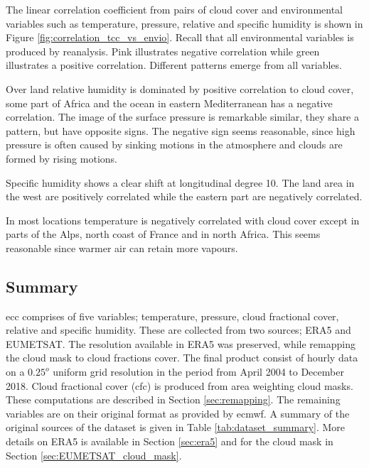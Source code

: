 The linear correlation coefficient from pairs of cloud cover and environmental variables such as temperature, pressure, relative and specific humidity is shown in Figure \ref{fig:correlation_tcc_vs_envio}. Recall that all environmental variables is produced by reanalysis. Pink illustrates negative correlation while green illustrates a positive correlation. Different patterns emerge from all variables. %

Over land relative humidity is dominated by positive correlation to cloud cover, some part of Africa and the ocean in eastern Mediterranean has a negative correlation. The image of the surface pressure is remarkable similar, they share a pattern, but have opposite signs. The negative sign seems reasonable, since high pressure is often caused by sinking motions in the atmosphere and clouds are formed by rising motions. 

Specific humidity shows a clear shift at longitudinal degree 10. The land area in the west are positively correlated while the eastern part are  negatively correlated. 

In most locations temperature is negatively correlated with cloud cover except in parts of the Alps, north coast of France and in north Africa. This seems reasonable since warmer air can retain more vapours.%

\subsection{Summary}
\acrshort{ecc} comprises of five variables; temperature, pressure, cloud fractional cover, relative and specific humidity. These are collected from two sources; ERA5 and EUMETSAT. The resolution available in ERA5 was preserved, while remapping the cloud mask to cloud fractions cover. 
The final product consist of %
hourly data on a $0.25^o$ uniform grid resolution in the period from April 2004 to December 2018. Cloud fractional cover (\acrshort{cfc}) is produced from area weighting cloud masks. These computations are described in Section \ref{sec:remapping}. The remaining variables are on their original format as provided by \acrfull{ecmwf}. A summary of the original sources of the dataset is given in Table \ref{tab:dataset_summary}. More details on ERA5 is available in Section \ref{sec:era5} and for the cloud mask in Section \ref{sec:EUMETSAT_cloud_mask}. 


